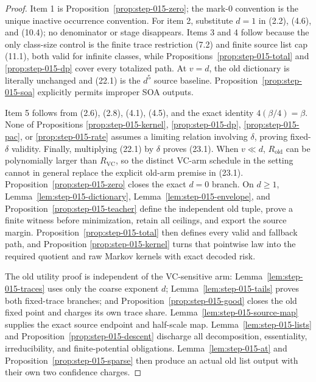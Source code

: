 \begin{proof}
Item 1 is Proposition~\ref{prop:step-015-zero}; the mark-\(0\) convention
is the unique inactive occurrence convention. For item 2, substitute
\(d=1\) in (2.2), (4.6), and (10.4); no denominator or stage disappears.
Items 3 and 4 follow because the only class-size control is the finite
trace restriction (7.2) and finite source list cap (11.1), both valid for
infinite classes, while Propositions~\ref{prop:step-015-total} and
\ref{prop:step-015-dp} cover every totalized path. At \(v=d\), the old
dictionary is literally unchanged and (22.1) is the \(d^5\) source
baseline. Proposition~\ref{prop:step-015-soa} explicitly permits improper
SOA outputs.

Item 5 follows from (2.6), (2.8), (4.1), (4.5), and the exact identity
\(4(\beta/4)=\beta\). None of Propositions
\ref{prop:step-015-kernel}, \ref{prop:step-015-dp},
\ref{prop:step-015-pac}, or \ref{prop:step-015-rate} assumes a limiting
relation involving \(\delta\), proving fixed-\(\delta\) validity. Finally,
multiplying (22.1) by \(\delta\) proves (23.1). When \(v\ll d\),
\(R_{\mathrm{old}}\) can be polynomially larger than \(R_{\mathrm{VC}}\),
so the distinct VC-arm schedule in the setting cannot in general replace
the explicit old-arm premise in (23.1). 
Proposition~\ref{prop:step-015-zero} closes the exact \(d=0\) branch. On
\(d\ge1\), Lemma~\ref{lem:step-015-dictionary},
Lemma~\ref{lem:step-015-envelope}, and
Proposition~\ref{prop:step-015-teacher} define the independent old tuple,
prove a finite witness before minimization, retain all ceilings, and export
the source margin. Proposition~\ref{prop:step-015-total} then defines every
valid and fallback path, and Proposition
\ref{prop:step-015-kernel} turns that pointwise law into the required
quotient and raw Markov kernels with exact decoded risk.

The old utility proof is independent of the VC-sensitive arm:
Lemma~\ref{lem:step-015-traces} uses only the coarse exponent \(d\);
Lemma~\ref{lem:step-015-tails} proves both fixed-trace branches; and
Proposition~\ref{prop:step-015-good} closes the old fixed point and charges
its own trace share. Lemma~\ref{lem:step-015-source-map} supplies the exact
source endpoint and half-scale map. Lemma~\ref{lem:step-015-lists} and
Proposition~\ref{prop:step-015-descent} discharge all decomposition,
essentiality, irreducibility, and finite-potential obligations.
Lemma~\ref{lem:step-015-at} and
Proposition~\ref{prop:step-015-sparse} then produce an actual old list
output with their own two confidence charges.


\end{proof}

